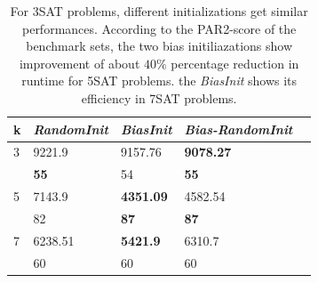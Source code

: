 \documentclass[12pt,a4paper,twoside]{scrartcl}
\numberwithin{equation}{section}
\begin{document}
\begin{table}[H]
\label{tab:com}
\begin{center}
    \begin{tabular}{|l|l|l|l|p{1cm}|}
\hline 
    k &\emph{RandomInit}&\emph{BiasInit}&\emph{Bias-RandomInit} \\ \hline
	3&9221.9 &9157.76 &\textbf{9078.27} \\ 
	&\textbf{55} &54 & \textbf{55} \\ \hline
	5&7143.9&\textbf{4351.09}&4582.54\\ 
	&82 &\textbf{87} &\textbf{87}\\ \hline
	7&6238.51&\textbf{5421.9}& 6310.7\\
	&60 & 60 & 60 \\ \hline
	
\end{tabular}
\caption{For 3SAT problems, different initializations get similar performances. According to the PAR2-score of the benchmark sets, the two bias initiliazations show improvement of about $40\%$ percentage reduction in runtime for 5SAT problems.  the \emph{BiasInit} shows its efficiency in 7SAT problems.}
\end{center}
\end{table} 
\clearpage
\end{document}
